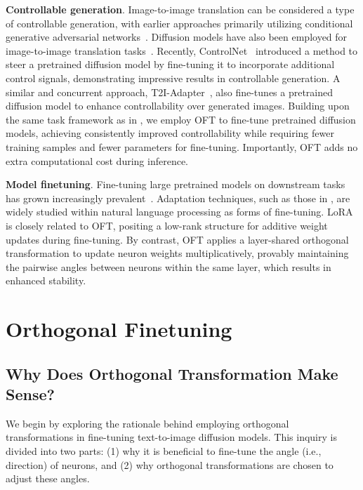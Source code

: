 \textbf{Controllable generation}. Image-to-image translation can be considered a type of controllable generation, with earlier approaches primarily utilizing conditional generative adversarial networks~\cite{isola2017image,zhu2017toward,wang2018high,park2019semantic,choi2018stargan}. Diffusion models have also been employed for image-to-image translation tasks~\cite{saharia2022palette,voynov2022sketch,wang2022pretraining}. Recently, ControlNet~\cite{zhang2023adding} introduced a method to steer a pretrained diffusion model by fine-tuning it to incorporate additional control signals, demonstrating impressive results in controllable generation. A similar and concurrent approach, T2I-Adapter~\cite{mou2023t2i}, also fine-tunes a pretrained diffusion model to enhance controllability over generated images. Building upon the same task framework as in \cite{zhang2023adding,mou2023t2i}, we employ OFT to fine-tune pretrained diffusion models, achieving consistently improved controllability while requiring fewer training samples and fewer parameters for fine-tuning. Importantly, OFT adds no extra computational cost during inference.

\textbf{Model finetuning}. Fine-tuning large pretrained models on downstream tasks has grown increasingly prevalent~\cite{devlin2018bert,brown2020language,he2022masked}. Adaptation techniques, such as those in \cite{hulora2022,houlsby2019parameter,pfeiffer2020adapterfusion}, are widely studied within natural language processing as forms of fine-tuning. LoRA~\cite{hulora2022} is closely related to OFT, positing a low-rank structure for additive weight updates during fine-tuning. By contrast, OFT applies a layer-shared orthogonal transformation to update neuron weights multiplicatively, provably maintaining the pairwise angles between neurons within the same layer, which results in enhanced stability.

\section{Orthogonal Finetuning}

\subsection{Why Does Orthogonal Transformation Make Sense?}

We begin by exploring the rationale behind employing orthogonal transformations in fine-tuning text-to-image diffusion models. This inquiry is divided into two parts: (1) why it is beneficial to fine-tune the angle (i.e., direction) of neurons, and (2) why orthogonal transformations are chosen to adjust these angles.

